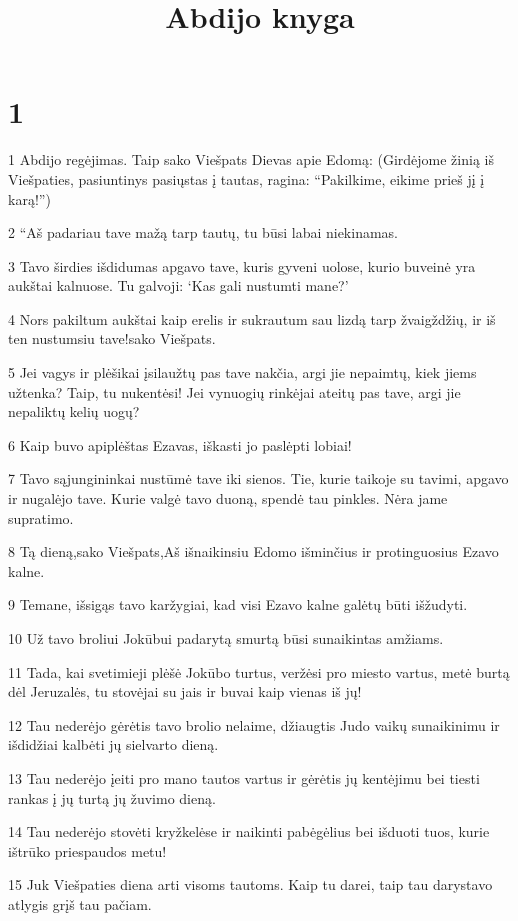 

\title{Abdijo knyga}

\chapter{1}


\par 1 Abdijo regėjimas. Taip sako Viešpats Dievas apie Edomą: (Girdėjome žinią iš Viešpaties, pasiuntinys pasiųstas į tautas, ragina: “Pakilkime, eikime prieš jį į karą!”) 
\par 2 “Aš padariau tave mažą tarp tautų, tu būsi labai niekinamas. 
\par 3 Tavo širdies išdidumas apgavo tave, kuris gyveni uolose, kurio buveinė yra aukštai kalnuose. Tu galvoji: ‘Kas gali nustumti mane?’ 
\par 4 Nors pakiltum aukštai kaip erelis ir sukrautum sau lizdą tarp žvaigždžių, ir iš ten nustumsiu tave!­sako Viešpats.­ 
\par 5 Jei vagys ir plėšikai įsilaužtų pas tave nakčia, argi jie nepaimtų, kiek jiems užtenka? Taip, tu nukentėsi! Jei vynuogių rinkėjai ateitų pas tave, argi jie nepaliktų kelių uogų? 
\par 6 Kaip buvo apiplėštas Ezavas, iškasti jo paslėpti lobiai! 
\par 7 Tavo sąjungininkai nustūmė tave iki sienos. Tie, kurie taikoje su tavimi, apgavo ir nugalėjo tave. Kurie valgė tavo duoną, spendė tau pinkles. Nėra jame supratimo. 
\par 8 Tą dieną,­sako Viešpats,­Aš išnaikinsiu Edomo išminčius ir protinguosius Ezavo kalne. 
\par 9 Temane, išsigąs tavo karžygiai, kad visi Ezavo kalne galėtų būti išžudyti. 
\par 10 Už tavo broliui Jokūbui padarytą smurtą būsi sunaikintas amžiams. 
\par 11 Tada, kai svetimieji plėšė Jokūbo turtus, veržėsi pro miesto vartus, metė burtą dėl Jeruzalės, tu stovėjai su jais ir buvai kaip vienas iš jų! 
\par 12 Tau nederėjo gėrėtis tavo brolio nelaime, džiaugtis Judo vaikų sunaikinimu ir išdidžiai kalbėti jų sielvarto dieną. 
\par 13 Tau nederėjo įeiti pro mano tautos vartus ir gėrėtis jų kentėjimu bei tiesti rankas į jų turtą jų žuvimo dieną. 
\par 14 Tau nederėjo stovėti kryžkelėse ir naikinti pabėgėlius bei išduoti tuos, kurie ištrūko priespaudos metu! 
\par 15 Juk Viešpaties diena arti visoms tautoms. Kaip tu darei, taip tau darys­tavo atlygis grįš tau pačiam. 

